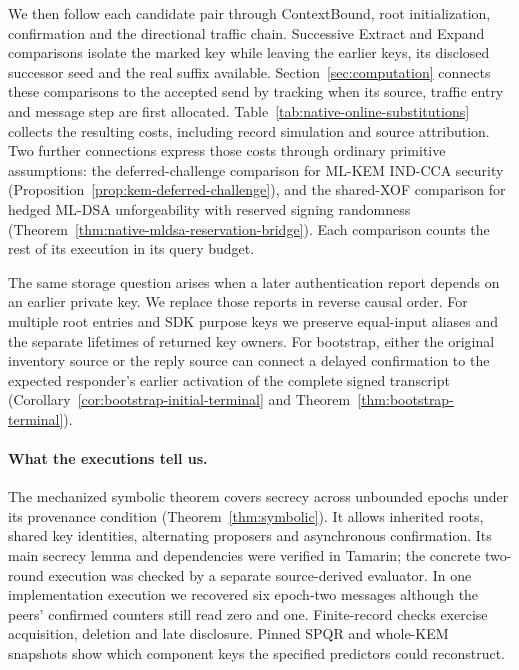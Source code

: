 \documentclass[pdflatex]{sn-jnl}
\theoremstyle{thmstyleone}
\theoremstyle{thmstylethree}
\theoremstyle{thmstyletwo}
\begin{document}
We then follow each candidate pair through ContextBound, root
initialization, confirmation and the directional traffic chain.
Successive Extract and Expand comparisons isolate the marked key while
leaving the earlier keys, its disclosed successor seed and the real
suffix available. Section~\ref{sec:computation} connects these comparisons
to the accepted send by tracking when its source, traffic entry and
message step are first allocated.
Table~\ref{tab:native-online-substitutions} collects the resulting costs,
including record simulation and source attribution. Two further
connections express those costs through ordinary primitive assumptions:
the deferred-challenge comparison for ML-KEM IND-CCA security
(Proposition~\ref{prop:kem-deferred-challenge}), and the shared-XOF
comparison for hedged ML-DSA unforgeability with reserved signing
randomness (Theorem~\ref{thm:native-mldsa-reservation-bridge}). Each
comparison counts the rest of its execution in its query budget.

The same storage question arises when a later authentication report
depends on an earlier private key. We replace those reports in reverse
causal order. For multiple root entries and SDK purpose keys we preserve
equal-input aliases and the separate lifetimes of returned key owners.
For bootstrap, either the original inventory source or the reply source
can connect a delayed confirmation to the expected responder's earlier
activation of the complete signed transcript
(Corollary~\ref{cor:bootstrap-initial-terminal} and
Theorem~\ref{thm:bootstrap-terminal}).

\paragraph{What the executions tell us.}
The mechanized symbolic theorem covers secrecy across unbounded epochs
under its provenance condition (Theorem~\ref{thm:symbolic}). It allows
inherited roots, shared key identities, alternating proposers and
asynchronous confirmation. Its main secrecy lemma and dependencies were
verified in Tamarin; the concrete two-round execution was checked by a
separate source-derived evaluator. In one implementation execution we recovered six
epoch-two messages although the peers' confirmed counters still read
zero and one. Finite-record checks exercise acquisition, deletion and
late disclosure. Pinned SPQR and whole-KEM snapshots show which
component keys the specified predictors could reconstruct.
\end{document}
